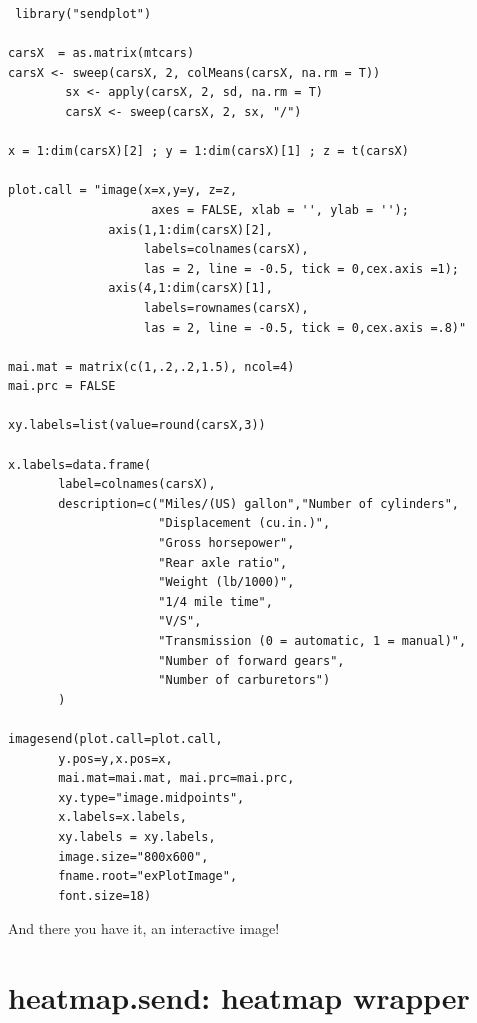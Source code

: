 \documentclass[]{article}
\begin{document}
\begin{verbatim}
 library("sendplot")

carsX  = as.matrix(mtcars)
carsX <- sweep(carsX, 2, colMeans(carsX, na.rm = T))
        sx <- apply(carsX, 2, sd, na.rm = T)
        carsX <- sweep(carsX, 2, sx, "/")

x = 1:dim(carsX)[2] ; y = 1:dim(carsX)[1] ; z = t(carsX)

plot.call = "image(x=x,y=y, z=z,
                    axes = FALSE, xlab = '', ylab = '');
              axis(1,1:dim(carsX)[2], 
                   labels=colnames(carsX),
                   las = 2, line = -0.5, tick = 0,cex.axis =1); 
              axis(4,1:dim(carsX)[1], 
                   labels=rownames(carsX),
                   las = 2, line = -0.5, tick = 0,cex.axis =.8)"

mai.mat = matrix(c(1,.2,.2,1.5), ncol=4)
mai.prc = FALSE

xy.labels=list(value=round(carsX,3))

x.labels=data.frame(
       label=colnames(carsX),
       description=c("Miles/(US) gallon","Number of cylinders",
                     "Displacement (cu.in.)",
                     "Gross horsepower",
                     "Rear axle ratio",
                     "Weight (lb/1000)",
                     "1/4 mile time",
                     "V/S",
                     "Transmission (0 = automatic, 1 = manual)",
                     "Number of forward gears",
                     "Number of carburetors")
       )

imagesend(plot.call=plot.call,
       y.pos=y,x.pos=x,
       mai.mat=mai.mat, mai.prc=mai.prc,
       xy.type="image.midpoints",
       x.labels=x.labels,
       xy.labels = xy.labels, 
       image.size="800x600",
       fname.root="exPlotImage",
       font.size=18)
\end{verbatim}
And there you have it, an interactive image! 
\newpage




























\section{heatmap.send: heatmap wrapper}
\end{document}
